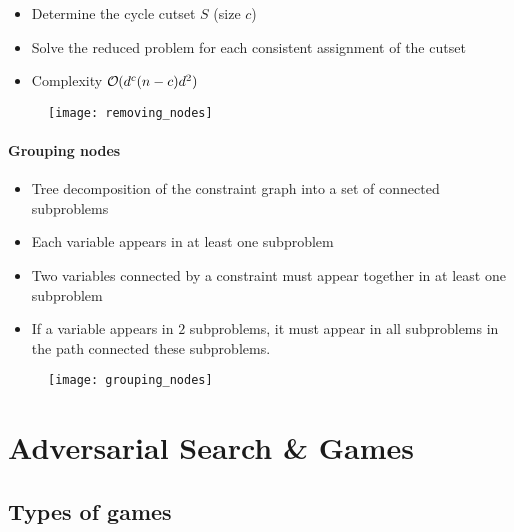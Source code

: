 \begin{minipage}{0.6\textwidth}
	\begin{itemize}
	\item Determine the cycle cutset $S$ (size $c$)
	\item Solve the reduced problem for each consistent assignment of the cutset
	\item Complexity $\bigO (d^c (n-c)d^2)$
	\end{itemize}
\end{minipage}
\begin{minipage}{0.4\textwidth}
	\begin{figure}[H]
		\centering
		\texttt{[image: removing\_nodes]}
	\end{figure}
\end{minipage}


\paragraph{Grouping nodes}

\begin{minipage}{0.6\textwidth}
	\begin{itemize}
	\item Tree decomposition of the constraint graph into a set of connected subproblems
	\item Each variable appears in at least one subproblem
	\item Two variables connected by a constraint must appear together in at least one subproblem
	\item If a variable appears in $2$ subproblems, it must appear in all subproblems in the path connected these subproblems.
	\end{itemize}
\end{minipage}
\begin{minipage}{0.4\textwidth}
	\begin{figure}[H]
		\centering
		\texttt{[image: grouping\_nodes]}
	\end{figure}
\end{minipage}

\section{Adversarial Search \& Games}

\subsection{Types of games}

